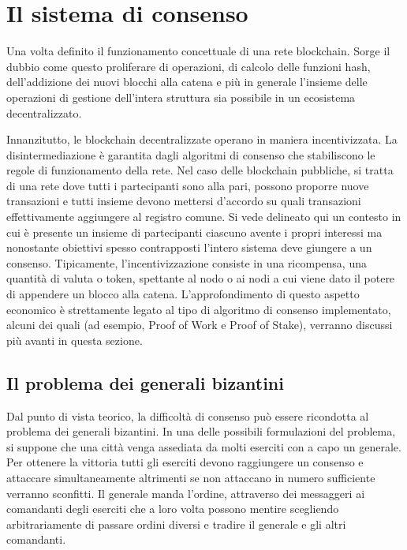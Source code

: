 \section{Il sistema di consenso} %

Una volta definito il funzionamento concettuale di una rete blockchain. Sorge il dubbio come questo proliferare di operazioni, di calcolo delle funzioni hash, dell'addizione dei nuovi blocchi alla catena e più in generale l'insieme delle operazioni di gestione dell'intera struttura sia possibile in un ecosistema decentralizzato. 

Innanzitutto, le blockchain decentralizzate operano in maniera incentivizzata. La disintermediazione è garantita dagli algoritmi di consenso che stabiliscono le regole di funzionamento della rete. Nel caso delle blockchain pubbliche, si tratta di una rete dove tutti i partecipanti sono alla pari, possono proporre nuove transazioni e tutti insieme devono mettersi d'accordo su quali transazioni effettivamente aggiungere al registro comune. Si vede delineato qui un contesto in cui è presente un insieme di partecipanti ciascuno avente i propri interessi ma nonostante obiettivi spesso contrapposti l'intero sistema deve giungere a un consenso. Tipicamente, l'incentivizzazione consiste in una ricompensa, una quantità di valuta o token, spettante al nodo o ai nodi a cui viene dato il potere di appendere un blocco alla catena. L’approfondimento di questo aspetto economico è strettamente legato al tipo di algoritmo di consenso implementato, alcuni dei quali (ad esempio, Proof of Work e Proof of Stake), verranno discussi più avanti in questa sezione.

\subsection{Il problema dei generali bizantini}

Dal punto di vista teorico, la difficoltà di consenso può essere ricondotta al problema dei generali bizantini. In una delle possibili formulazioni del problema, si suppone che una città venga assediata da molti eserciti con a capo un generale. Per ottenere la vittoria tutti gli eserciti devono raggiungere un consenso e attaccare simultaneamente altrimenti se non attaccano in numero sufficiente verranno sconfitti. Il generale manda l’ordine, attraverso dei messaggeri ai comandanti degli eserciti che a loro volta possono mentire scegliendo arbitrariamente di passare ordini diversi e tradire il generale e gli altri comandanti.

